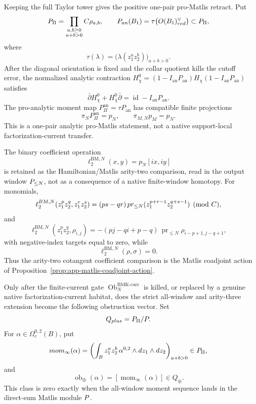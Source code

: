 \begin{thm}
  Keeping the full Taylor tower gives the positive one-pair pro-Matlis
  retract.  Put
  \[
    P_{\Pi}
      =
      \prod_{\substack{a,b\geq0\\a+b>0}}C\rho_{a,b},
    \qquad
    P_{an}(B_1)
      =
      \tau\bigl(O(B_1)^\vee_{red}\bigr)
      \subset P_{\Pi},
  \]
  where
  \[
    \tau(\lambda)
      =
      \bigl(\lambda(z_1^az_2^b)\bigr)_{a+b>0}.
  \]
  After the diagonal orientation is fixed and the collar quotient kills
  the cutoff error, the normalized analytic contraction
  \(H_\chi^0=(1-I_{\mathrm{an}}P_{\mathrm{an}})
  H_\chi(1-I_{\mathrm{an}}P_{\mathrm{an}})\) satisfies
  \[
    \bar\partial H_\chi^0+H_\chi^0\bar\partial
    =
    \operatorname{id}-I_{\mathrm{an}}P_{\mathrm{an}}.
  \]
  The pro-analytic moment map
  \(P_{\Pi}^{\mathrm{an}}=\tau P_{\mathrm{an}}\) has compatible finite
  projections
  \[
    \pi_NP_{\Pi}^{\mathrm{an}}=p_N,\qquad
    \pi_{M,N}p_M=p_N .
  \]
  This is a one-pair analytic pro-Matlis statement, not a native
  support-local factorization-current transfer.

  The binary coefficient operation
  \[
    \ell^{\mathrm{BM},N}_2(x,y)=p_N[ix,iy]
  \]
  is retained as the Hamiltonian/Matlis arity-two comparison, read in the
  output window \(P_{\leq N}\), not as a consequence of a native
  finite-window homotopy.  For monomials,
  \[
    \ell^{BM,N}_2
    (z_1^pz_2^q,z_1^rz_2^s)
      =
      (ps-qr)\,
      pr_{\leq N}
      (z_1^{p+r-1}z_2^{q+s-1})
      \pmod{C},
  \]
  and
  \[
    \ell^{\mathrm{BM},N}_2(z_1^pz_2^q,\rho_{i,j})
      =
      -(pj-qi+p-q)\,
      \operatorname{pr}_{\leq N}
      \rho_{i-p+1,j-q+1},
  \]
  with negative-index targets equal to zero, while
  \[
    \ell^{\mathrm{BM},N}_2(\rho,\sigma)=0 .
  \]
  Thus the arity-two cotangent coefficient comparison is the Matlis
  coadjoint action of
  Proposition~\ref{prop:app-matlis-coadjoint-action}.

  Only after the finite-current gate
  \(\operatorname{Ob}^{\mathrm{BMK\mbox{-}curr}}_N\) is killed, or
  replaced by a genuine native factorization-current habitat, does the
  strict all-window and arity-three extension become the following
  obstruction vector.  Set
  \[
    Q_{plus}=P_{\Pi}/P .
  \]
  For \(\alpha\in\Omega_c^{0,2}(B)\), put
  \[
    mom_{\infty}(\alpha)
      =
      \left(
        \int_B z_1^az_2^b\,
        \alpha^{0,2}\wedge dz_1\wedge dz_2
      \right)_{a+b>0}
      \in P_{\Pi},
  \]
  and
  \[
    \operatorname{ob}_{\oplus}(\alpha)
      =
      [\operatorname{mom}_{\infty}(\alpha)]
      \in Q_{\oplus} .
  \]
  This class is zero exactly when the all-window moment sequence lands in
  the direct-sum Matlis module \(P\).


\end{thm}
